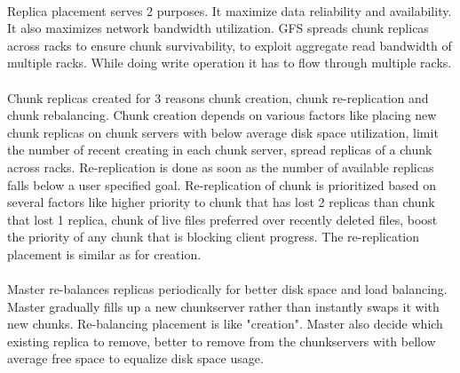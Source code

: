\documentclass[8pt]{extarticle}
\begin{document}
	\paragraph{}
	Replica placement serves 2 purposes. It maximize data reliability and availability. It also maximizes network bandwidth utilization. GFS spreads chunk replicas  across racks to ensure chunk survivability, to exploit aggregate read bandwidth of multiple racks. While doing write operation it has to flow through multiple racks.
	
	\paragraph{}
	Chunk replicas created for 3 reasons chunk creation, chunk re-replication and chunk rebalancing. Chunk creation depends on various factors like placing new chunk replicas on chunk servers with below average disk space utilization, limit the number of recent creating in each chunk server, spread replicas of a chunk across racks.
	Re-replication is done  as soon as the number of available replicas falls below a user specified goal. Re-replication of chunk is prioritized based on several factors like higher priority to chunk that has lost 2 replicas than chunk that lost 1 replica, chunk of live files preferred over recently deleted files, boost the priority of any chunk that is blocking client progress. The re-replication placement is similar as for creation. 
	
	\paragraph{}
	Master re-balances replicas periodically for better disk space and load balancing. Master gradually fills up a new chunkserver rather than instantly swaps it with new chunks. Re-balancing placement is like "creation". Master also decide  which existing replica to remove, better to remove from the chunkservers with bellow average free space to equalize disk space usage.
\end{document}

